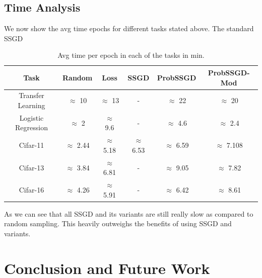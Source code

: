 \documentclass[a4paper,twoside]{iiththesis}
\theoremstyle{definition}
\theoremstyle{definition}
\theoremstyle{remark}
\begin{document}
\section{Time Analysis}
We now show the avg time epochs for different tasks stated above. The standard SSGD
\begin{table}[!htb]\label{Dataset}
	\renewcommand{\arraystretch}{1.5}
	\centering
	\begin{tabular}{|c|c|c|c|c|c|} \hline
		\textbf{Task} & \textbf{Random} & \textbf{Loss} & \textbf{SSGD} & \textbf{ProbSSGD} & \textbf{ProbSSGD-Mod}\\ \hline
		Transfer Learning & $\approx$ 10  &  $\approx$ 13 & - & $\approx$ 22 & $\approx$ 20\\ \hline
		Logistic Regression & $\approx$ 2   &  $\approx$ 9.6 & - & $\approx$ 4.6 & $\approx$ 2.4 \\ \hline
        Cifar-11 & $\approx$ 2.44  &  $\approx$ 5.18 & $\approx$ 6.53 & $\approx$ 6.59 & $\approx$ 7.108 \\ \hline
		Cifar-13 & $\approx$  3.84 &  $\approx$ 6.81 & - & $\approx$ 9.05 & $\approx$ 7.82 \\ \hline
		Cifar-16 & $\approx$ 4.26 & $\approx$ 5.91 & - & $\approx$ 6.42 & $\approx$ 8.61\\ 
\hline
	\end{tabular}
    \caption{Avg time per epoch in each of the tasks in min.}
\end{table}

As we can see that all SSGD and its variants are still really slow as compared to random sampling. This heavily outweighs the benefits of using SSGD and variants.

\chapter{Conclusion and Future Work}
\end{document}
